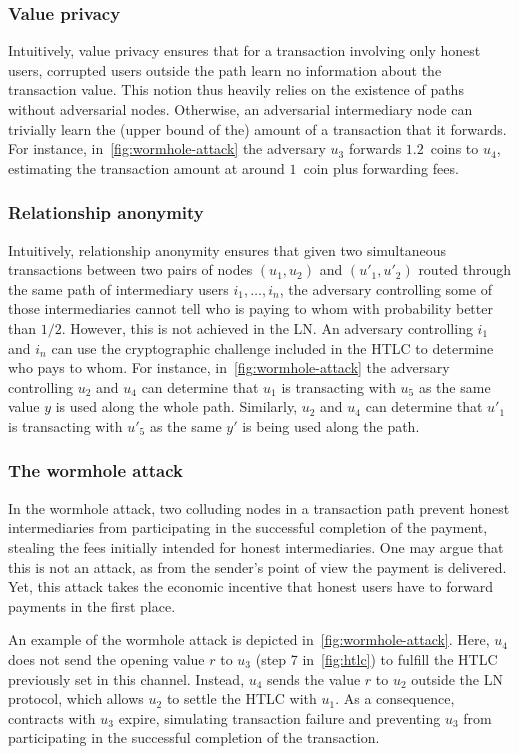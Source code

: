 \subsubsection{Value privacy}
Intuitively, value privacy ensures that for a transaction involving only honest users, corrupted users outside the path learn no information about the transaction value.
This notion thus heavily relies on the existence of paths without adversarial nodes.
Otherwise, an adversarial intermediary node can trivially learn the (upper bound of the) amount of a transaction that it forwards.
For instance, in~\cref{fig:wormhole-attack} the adversary $u_3$ forwards $1.2$~coins to $u_4$, estimating the transaction amount at around $1$~coin plus forwarding fees.

\subsubsection{Relationship anonymity}
Intuitively, relationship anonymity ensures that given two simultaneous transactions between two pairs of nodes $(u_1, u_2)$ and $(u'_1, u'_2)$ routed through the same path of intermediary users $i_1, \ldots, i_n$, the adversary controlling some of those intermediaries cannot tell who is paying to whom with probability better than $1/2$.
However, this is not achieved in the LN\@.
An adversary controlling $i_1$ and $i_n$ can use the cryptographic challenge included in the HTLC to determine who pays to whom.
For instance, in~\cref{fig:wormhole-attack} the adversary controlling $u_2$ and $u_4$ can determine that $u_1$ is transacting with $u_5$ as the same value $y$ is used along the whole path.
Similarly, $u_2$ and $u_4$ can determine that $u'_1$ is transacting with $u'_5$ as the same $y'$ is being used along the path.

\subsubsection{The wormhole attack}
In the wormhole attack, two colluding nodes in a transaction path prevent honest intermediaries from participating in the successful completion of the payment, stealing the fees initially intended for honest intermediaries.
One may argue that this is not an attack, as from the sender's point of view the payment is delivered.
Yet, this attack takes the economic incentive that honest users have to forward payments in the first place.

An example of the wormhole attack is depicted in~\cref{fig:wormhole-attack}.
Here, $u_4$ does not send the opening value $r$ to $u_3$ (step 7 in~\cref{fig:htlc}) to fulfill the HTLC previously set in this channel.
Instead, $u_4$ sends the value $r$ to $u_2$ outside the LN protocol, which allows $u_2$ to settle the HTLC with $u_1$.
As a consequence, contracts with $u_3$ expire, simulating transaction failure and preventing $u_3$ from participating in the successful completion of the transaction.


